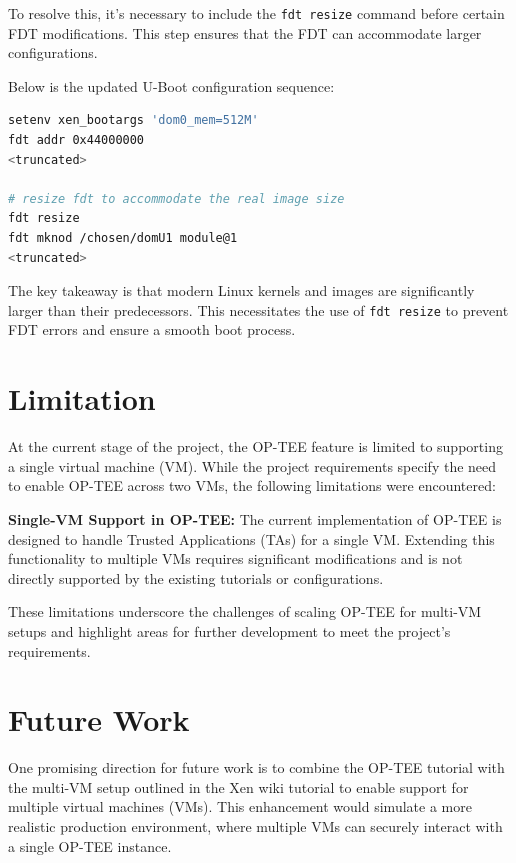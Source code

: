 \documentclass[acmtog]{acmart}
\begin{document}
To resolve this, it's necessary to include the \texttt{fdt resize} command before certain FDT modifications. This step ensures that the FDT can accommodate larger configurations.


Below is the updated U-Boot configuration sequence:

\begin{lstlisting}[language=bash, caption=Solution to U-Boot error]
setenv xen_bootargs 'dom0_mem=512M'
fdt addr 0x44000000
<truncated>

# resize fdt to accommodate the real image size
fdt resize
fdt mknod /chosen/domU1 module@1
<truncated>
\end{lstlisting}


The key takeaway is that modern Linux kernels and images are significantly larger than their predecessors. This necessitates the use of \texttt{fdt resize} to prevent FDT errors and ensure a smooth boot process.

\section{Limitation}

At the current stage of the project, the OP-TEE feature is limited to supporting a single virtual machine (VM). While the project requirements specify the need to enable OP-TEE across two VMs, the following limitations were encountered:

\textbf{Single-VM Support in OP-TEE:} The current implementation of OP-TEE is designed to handle Trusted Applications (TAs) for a single VM. Extending this functionality to multiple VMs requires significant modifications and is not directly supported by the existing tutorials or configurations.


These limitations underscore the challenges of scaling OP-TEE for multi-VM setups and highlight areas for further development to meet the project’s requirements.


\section{Future Work}

One promising direction for future work is to combine the OP-TEE tutorial with the multi-VM setup outlined in the Xen wiki tutorial to enable support for multiple virtual machines (VMs). This enhancement would simulate a more realistic production environment, where multiple VMs can securely interact with a single OP-TEE instance.
\end{document}
